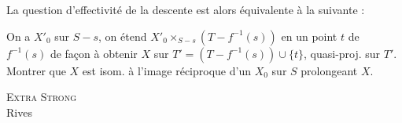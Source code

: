 La question d'effectivité de la descente est alors équivalente à la suivante :

On a $X'_0$ sur $S-s$, on étend $X'_0\times_{S-s}(T-f^{-1}(s))$ en un point $t$ de $f^{-1}(s)$ de façon à obtenir $X$ sur $T'=(T-f^{-1}(s))\cup\{t\}$, quasi-proj. sur $T'$. Montrer que $X$ est isom. à l'image réciproque d'un $X_0$ sur $S$ prolongeant $X$.

\textsc{Extra Strong}\\
 Rives
